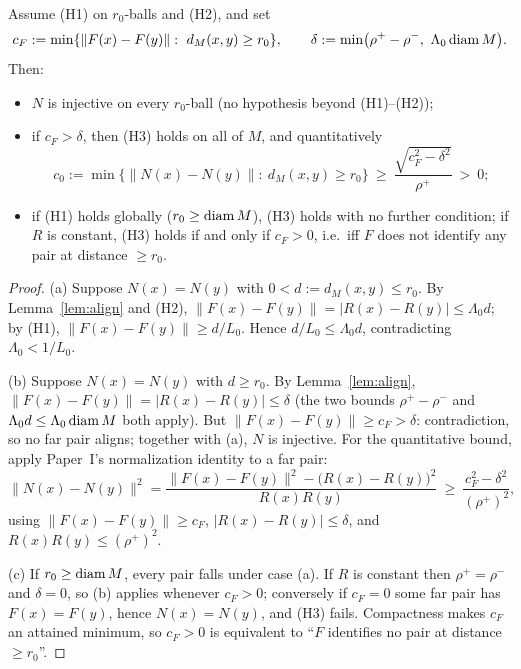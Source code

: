 \begin{lemma}[(H3) from (H1)--(H2)]\label{lem:h3}
Assume (H1) on $r_0$-balls and (H2), and set
\[
c_F:=\min\{\lVert F(x)-F(y)\rVert:\ d_M(x,y)\ge r_0\},\qquad
\delta:=\min\bigl(\rho^+-\rho^-,\ \Lambda_0\operatorname{diam} M\bigr).
\]
Then:
\begin{itemize}
\item[(a)] $N$ is injective on every $r_0$-ball (no hypothesis beyond (H1)--(H2));
\item[(b)] if $c_F>\delta$, then (H3) holds on all of $M$, and quantitatively
\[
c_0:=\min\{\lVert N(x)-N(y)\rVert:\ d_M(x,y)\ge r_0\}\ \ge\
\frac{\sqrt{c_F^2-\delta^2}}{\rho^+}\ >\ 0 ;
\]
\item[(c)] if (H1) holds globally ($r_0\ge\operatorname{diam} M$), (H3) holds with no further
condition; if $R$ is constant, (H3) holds if and only if $c_F>0$, i.e.\ iff $F$ does
not identify any pair at distance $\ge r_0$.
\end{itemize}
\end{lemma}

\begin{proof}
(a) Suppose $N(x)=N(y)$ with $0<d:=d_M(x,y)\le r_0$. By Lemma~\ref{lem:align} and (H2),
$\lVert F(x)-F(y)\rVert=\lvert R(x)-R(y)\rvert\le\Lambda_0 d$; by (H1),
$\lVert F(x)-F(y)\rVert\ge d/L_0$. Hence $d/L_0\le\Lambda_0 d$, contradicting
$\Lambda_0<1/L_0$.

(b) Suppose $N(x)=N(y)$ with $d\ge r_0$. By Lemma~\ref{lem:align},
$\lVert F(x)-F(y)\rVert=\lvert R(x)-R(y)\rvert\le\delta$ (the two bounds
$\rho^+-\rho^-$ and $\Lambda_0 d\le\Lambda_0\operatorname{diam} M$ both apply). But
$\lVert F(x)-F(y)\rVert\ge c_F>\delta$: contradiction, so no far pair aligns; together
with (a), $N$ is injective. For the quantitative bound, apply Paper~I's normalization
identity to a far pair:
\[
\lVert N(x)-N(y)\rVert^2
=\frac{\lVert F(x)-F(y)\rVert^2-\bigl(R(x)-R(y)\bigr)^2}{R(x)R(y)}
\ \ge\ \frac{c_F^2-\delta^2}{(\rho^+)^2},
\]
using $\lVert F(x)-F(y)\rVert\ge c_F$, $\lvert R(x)-R(y)\rvert\le\delta$, and
$R(x)R(y)\le(\rho^+)^2$.

(c) If $r_0\ge\operatorname{diam} M$, every pair falls under case (a). If $R$ is constant then
$\rho^+=\rho^-$ and $\delta=0$, so (b) applies whenever $c_F>0$; conversely if $c_F=0$
some far pair has $F(x)=F(y)$, hence $N(x)=N(y)$, and (H3) fails. Compactness makes
$c_F$ an attained minimum, so $c_F>0$ is equivalent to ``$F$ identifies no pair at
distance $\ge r_0$''.
\end{proof}

